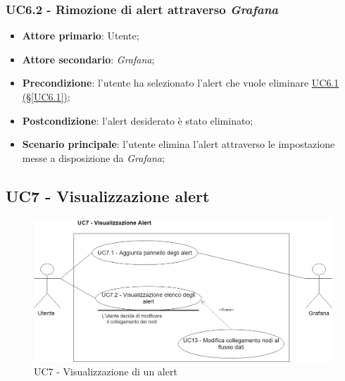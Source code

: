 \subsubsection{UC6.2 - Rimozione di alert attraverso \textit{Grafana}}\label{UC6.2}
\begin{itemize}
	\item \textbf{Attore primario}: Utente;
	\item \textbf{Attore secondario}: \textit{Grafana};
	\item \textbf{Precondizione}:  l'utente ha selezionato l'alert che vuole eliminare \hyperref[UC6.1]{UC6.1 (§\ref*{UC6.1})};
	\item \textbf{Postcondizione}: l'alert desiderato è stato eliminato;
	\item \textbf{Scenario principale}: l'utente elimina l'alert attraverso le impostazione messe a disposizione da \textit{Grafana};
\end{itemize}

\pagebreak

\subsection{UC7 - Visualizzazione alert}\label{UC7}

\begin{figure}[H]
	\centering
	\includegraphics[scale=0.4]{./images/UC7.png}
	\caption{UC7 - Visualizzazione di un alert}
\end{figure}


